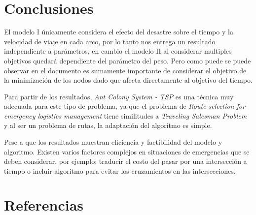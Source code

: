\documentclass[letter, 10pt]{article}
\begin{document}
\section{Conclusiones}


El modelo I únicamente considera el efecto del desastre sobre el tiempo y la velocidad de viaje en cada arco, por lo tanto nos entrega un resultado independiente a parámetros, en cambio el modelo II al considerar multiples objetivos quedará dependiente del parámetro del peso. Pero como puede se puede observar en el documento es sumamente importante de considerar el objetivo de la minimización de los nodos dado que afecta directamente al objetivo del tiempo.


Para partir de los resultados,  \textit{Ant Colony System - TSP} es una técnica muy adecuada para este tipo de problema, ya que el problema de \textit{Route selection for emergency logistics management} tiene similitudes a  \textit{Traveling Salesman Problem} y al ser un problema de rutas, la adaptación del algoritmo es simple. 

Pese a que los resultados muestran eficiencia y factibilidad del modelo y algoritmo. Existen varios factores complejos en situaciones de emergencias que se deben considerar, por ejemplo: traducir el costo del pasar por una intersección a tiempo o incluir algoritmo para evitar los cruzamientos en las intersecciones.

\section{Referencias}
\begingroup
\renewcommand{\section}[2]{}%

\endgroup
\end{document}
